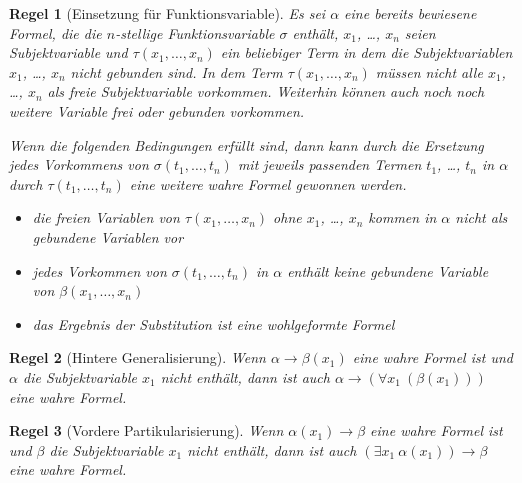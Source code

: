 \documentclass[a4paper,german,10pt,twoside]{book}
\newtheorem{rul}{Regel}
\theoremstyle{definition}
\theoremstyle{remark}
\begin{document}
\begin{rul}[Einsetzung f{\"u}r Funktionsvariable]
\label{rule:replaceFunct} \hypertarget{rule:replaceFunct}{}
Es sei $\alpha$ eine bereits bewiesene Formel, die die $n$-stellige Funktionsvariable $\sigma$ enth{\"a}lt, $x_1$, \ldots, $x_n$ seien Subjektvariable und $\tau(x_1, \ldots, x_n)$ ein beliebiger Term in dem die Subjektvariablen $x_1$, \ldots, $x_n$ nicht gebunden sind. In dem Term $\tau(x_1, \ldots, x_n)$ m{\"u}ssen nicht alle $x_1$, \ldots, $x_n$ als freie Subjektvariable vorkommen. Weiterhin k{\"o}nnen auch noch  noch weitere Variable frei oder gebunden vorkommen.

Wenn die folgenden Bedingungen erf{\"u}llt sind, dann kann durch die Ersetzung jedes Vorkommens von $\sigma(t_1, \ldots, t_n)$ mit jeweils passenden Termen $t_1$, \ldots, $t_n$ in $\alpha$ durch $\tau(t_1, \ldots, t_n)$ eine weitere wahre Formel gewonnen 
werden.

\begin{itemize}

\item
die freien Variablen von $\tau(x_1, \ldots, x_n)$ ohne $x_1$, \ldots, $x_n$ kommen in $\alpha$ nicht als gebundene Variablen vor

\item
jedes Vorkommen von $\sigma(t_1, \ldots, t_n)$ in $\alpha$ enth{\"a}lt keine gebundene Variable von $\beta(x_1, \ldots, x_n)$

\item
das Ergebnis der Substitution ist eine wohlgeformte Formel

\end{itemize}
\end{rul}




\par


\begin{rul}[Hintere Generalisierung]
\label{rule:universalIntroduction} \hypertarget{rule:universalIntroduction}{}
Wenn $\alpha \rightarrow \beta(x_1)$ eine wahre Formel ist und $\alpha$ die Subjektvariable $x_1$ nicht enth{\"a}lt, dann ist auch $\alpha \rightarrow (\forall x_1~(\beta(x_1)))$ 
eine wahre Formel.
\end{rul}




\par


\begin{rul}[Vordere Partikularisierung]
\label{rule:existentialIntroduction} \hypertarget{rule:existentialIntroduction}{}
Wenn $\alpha(x_1) \rightarrow \beta$ eine wahre Formel ist und $\beta$ die Subjektvariable $x_1$ nicht enth{\"a}lt, dann ist auch $(\exists x_1~\alpha(x_1)) \rightarrow \beta$ eine wahre Formel.
\end{rul}
\end{document}
